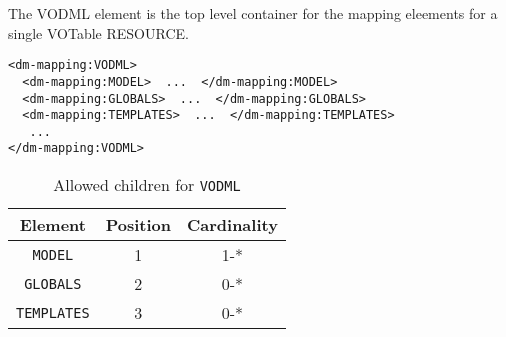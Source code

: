 The VODML element is the top level container for the mapping eleements for a single VOTable RESOURCE.

\begin{lstlisting}[frame=single,caption={Example VODML mapping block},style=XML,basicstyle=\tiny]
<dm-mapping:VODML>
  <dm-mapping:MODEL>  ...  </dm-mapping:MODEL>
  <dm-mapping:GLOBALS>  ...  </dm-mapping:GLOBALS>
  <dm-mapping:TEMPLATES>  ...  </dm-mapping:TEMPLATES>
   ...
</dm-mapping:VODML>
\end{lstlisting}

\begin{table}[!htbp]
  \small
  \centering
  \begin{tabulary}{\linewidth}{|c |c |c|}
    \hline 
        \textbf{Element} &
        \textbf{Position} &
        \textbf{Cardinality}\\
    \hline
    \hline  
      \texttt{MODEL} &           
      1 &           
      1-*\\
    \hline    
      \texttt{GLOBALS} &           
      2 &           
      0-*\\
    \hline  
      \texttt{TEMPLATES} &           
      3 &           
      0-*\\
    \hline 
  \end{tabulary}
    \caption{Allowed children for \texttt{VODML}} 
    \label{tbl:vodml-children}
\end{table}


